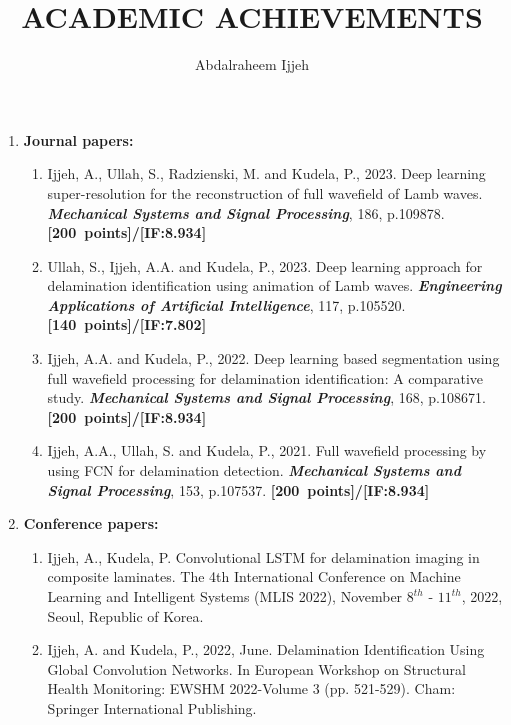 \documentclass[11pt, a4paper]{article}
\title{ACADEMIC ACHIEVEMENTS}
\author{Abdalraheem Ijjeh}
\begin{document}
	\maketitle
	\begin{enumerate}
		\item \textbf{Journal papers:}
		\begin{enumerate}
			\item Ijjeh, A., Ullah, S., Radzienski, M. and Kudela, P., 2023. Deep learning super-resolution for the reconstruction of full wavefield of Lamb waves. \textbf{\textit{Mechanical Systems and Signal Processing}}, 186, p.109878.						
			\textbf{[200~points]/[IF:8.934]}
			\item Ullah, S., Ijjeh, A.A. and Kudela, P., 2023. Deep learning approach for delamination identification using animation of Lamb waves. 						
			\textbf{\textit{Engineering Applications of Artificial Intelligence}}, 117, p.105520.		
			\textbf{[140~points]/[IF:7.802]}
			\item Ijjeh, A.A. and Kudela, P., 2022. Deep learning based segmentation using full wavefield processing for delamination identification: A comparative study. \textbf{\textit{Mechanical Systems and Signal Processing}}, 168, p.108671. \textbf{[200~points]/[IF:8.934]}
			\item Ijjeh, A.A., Ullah, S. and Kudela, P., 2021. Full wavefield processing by using FCN for delamination detection. \textbf{\textit{Mechanical Systems and Signal Processing}}, 153, p.107537.		
			\textbf{[200~points]/[IF:8.934]}	
		\end{enumerate}		
		\item \textbf{Conference papers:}
		\begin{enumerate}
			\item {Ijjeh, A.}, Kudela, P. Convolutional LSTM for delamination imaging in composite laminates. 
			The 4th International Conference on Machine Learning and Intelligent Systems (MLIS 2022), November \(8^{th}\) - \(11^{th}\), 2022, Seoul, Republic of Korea.
			\item Ijjeh, A. and Kudela, P., 2022, June. Delamination Identification Using Global Convolution Networks. 
			In European Workshop on Structural Health Monitoring: EWSHM 2022-Volume 3 (pp. 521-529). Cham: Springer International Publishing.		

\end{enumerate}
\end{enumerate}
\end{document}
